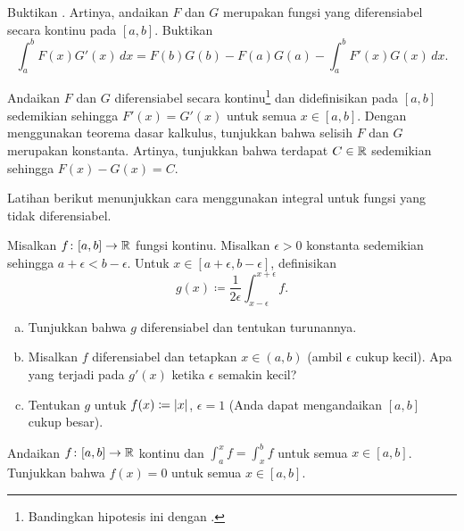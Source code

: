 \begin{exercise}
Buktikan \emph{}.  Artinya, andaikan $F$ dan
$G$ merupakan fungsi yang diferensiabel secara kontinu pada $[a,b]$.  Buktikan
\begin{equation*}
\int_a^b F(x)G'(x)\,dx
=
F(b)G(b)-F(a)G(a)
-
\int_a^b F'(x)G(x)\,dx .
\end{equation*}
\end{exercise}

\begin{exercise}
Andaikan $F$ dan $G$
diferensiabel secara kontinu\footnote{
Bandingkan hipotesis ini dengan .}
dan didefinisikan
pada $[a,b]$
sedemikian sehingga $F'(x) = G'(x)$ untuk semua $x \in [a,b]$.
Dengan menggunakan teorema dasar kalkulus,
tunjukkan bahwa selisih $F$ dan $G$ merupakan konstanta.  Artinya, tunjukkan bahwa
terdapat $C \in {\mathbb{R}}$ sedemikian sehingga
$F(x)-G(x) = C$.
\end{exercise}

\begin{exnote}
Latihan berikut menunjukkan cara menggunakan integral untuk 
fungsi yang tidak diferensiabel.
\end{exnote}

\begin{exercise} \label{exercise:smoothingout}
Misalkan $f \colon [a,b] \to {\mathbb{R}}$ fungsi kontinu.  Misalkan $\epsilon > 0$
konstanta sedemikian sehingga $a+\epsilon < b-\epsilon$.  Untuk $x \in [a+\epsilon,b-\epsilon]$, definisikan
\begin{equation*}
g(x) \coloneqq \frac{1}{2\epsilon} \int_{x-\epsilon}^{x+\epsilon} f .
\end{equation*}
\begin{enumerate}[a)]
\item
Tunjukkan bahwa $g$ diferensiabel dan tentukan turunannya.
\item
Misalkan $f$ diferensiabel dan tetapkan $x \in (a,b)$ (ambil $\epsilon$
cukup kecil).  Apa yang terjadi pada $g'(x)$ ketika $\epsilon$ semakin kecil?
\item
Tentukan $g$ untuk $f(x) \coloneqq \lvert {x} \rvert$, $\epsilon = 1$ (Anda dapat mengandaikan
$[a,b]$ cukup besar).
\end{enumerate}
\end{exercise}

\begin{exercise}
Andaikan $f \colon [a,b] \to {\mathbb{R}}$ kontinu dan
$\int_a^x f = \int_x^b f$ untuk semua $x \in [a,b]$.  Tunjukkan bahwa $f(x) = 0$
untuk semua $x \in [a,b]$.
\end{exercise}

